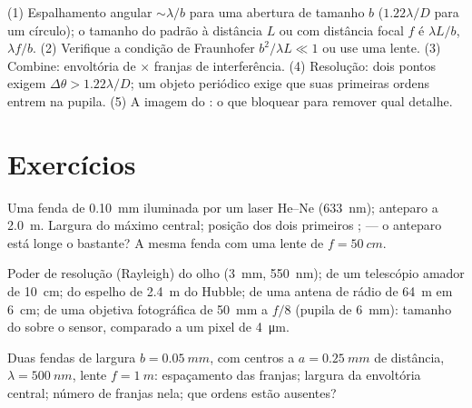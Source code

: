 \begin{method}\label{met:b2:diffraction:method}
(1) Espalhamento angular $\sim\lambda/b$ para uma abertura de tamanho $b$ ($1.22\lambda/D$ para
um círculo); o tamanho do padrão à distância $L$ ou com distância focal $f$ é
$\lambda L/b$, $\lambda f/b$. (2) Verifique a condição de Fraunhofer $b^2/\lambda L \ll 1$ ou
use uma lente. (3) Combine: envoltória de  $\times$ franjas de
interferência. (4) Resolução: dois pontos exigem $\Delta\theta > 1.22\lambda/D$; um objeto
periódico exige que suas primeiras ordens entrem na pupila. (5) A imagem do
: o que bloquear para remover qual detalhe.
\end{method}

\section{Exercícios}

\begin{exercise}[$\star$]\label{exo:b2:diffraction:1}
Uma fenda de \qty{0.10}{mm} iluminada por um laser He--Ne (\qty{633}{nm}); anteparo a
\qty{2.0}{m}. Largura do máximo central; posição dos dois primeiros
;  --- o anteparo está longe o bastante? A mesma
fenda com uma lente de $f = \qty{50}{cm}$.
\end{exercise}

\begin{exercise}[$\star$]\label{exo:b2:diffraction:2}
Poder de resolução (Rayleigh) do olho (\qty{3}{mm}, \qty{550}{nm}); de um
telescópio amador de \qty{10}{cm}; do espelho de \qty{2.4}{m} do Hubble; de uma antena de rádio de \qty{64}{m}
em \qty{6}{cm}; de uma objetiva fotográfica de \qty{50}{mm} a $f/8$ (pupila de \qty{6}{mm}):
tamanho do  sobre o sensor, comparado a um pixel de \qty{4}{\micro m}.
\end{exercise}

\begin{exercise}[$\star$]\label{exo:b2:diffraction:3}
Duas fendas de largura $b = \qty{0.05}{mm}$, com centros a $a = \qty{0.25}{mm}$ de distância, $\lambda =
\qty{500}{nm}$, lente $f = \qty{1}{m}$: espaçamento das franjas; largura da envoltória
central; número de franjas nela; que ordens estão ausentes?
\end{exercise}

